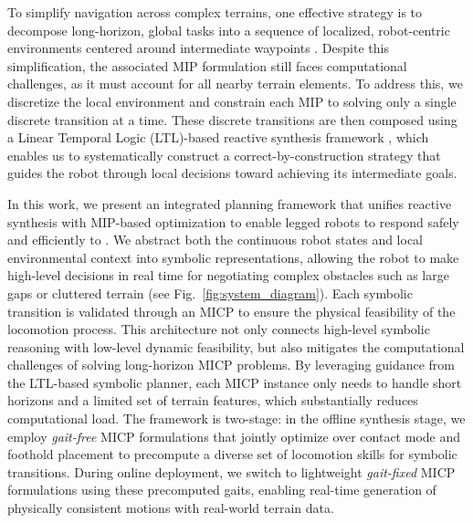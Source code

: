 To simplify navigation across complex terrains, one effective strategy is to decompose long-horizon, global tasks into a sequence of localized, robot-centric environments centered around intermediate waypoints \citep{fankhauser2018robust}. Despite this simplification, the associated MIP formulation still faces computational challenges, as it must account for all nearby terrain elements.
To address this, we discretize the local environment and constrain each MIP to solving only a single discrete transition at a time. These discrete transitions are then composed using a Linear Temporal Logic (LTL)-based reactive synthesis framework \citep{bloem2012synthesis}, which enables us to systematically construct a correct-by-construction strategy that guides the robot through local decisions toward achieving its intermediate goals.

In this work, we present an integrated planning framework that unifies reactive synthesis with MIP-based optimization to enable legged robots to respond safely and efficiently to . We abstract both the continuous robot states and local environmental context into symbolic representations, allowing the robot to make high-level decisions in real time for negotiating complex obstacles such as large gaps or cluttered terrain (see Fig.~\ref{fig:system_diagram}). Each symbolic transition is validated through an MICP to ensure the physical feasibility of the locomotion process. This architecture not only connects high-level symbolic reasoning with low-level dynamic feasibility, but also mitigates the computational challenges of solving long-horizon MICP problems.
By leveraging guidance from the LTL-based symbolic planner, each MICP instance only needs to handle short horizons and a limited set of terrain features, which substantially reduces computational load.
The framework is two-stage: in the offline synthesis stage, we employ \textit{gait-free} MICP formulations that jointly optimize over contact mode and foothold placement to precompute a diverse set of locomotion skills for symbolic transitions. During online deployment, we switch to lightweight \textit{gait-fixed} MICP formulations using these precomputed gaits, enabling real-time generation of physically consistent motions with real-world terrain data.

